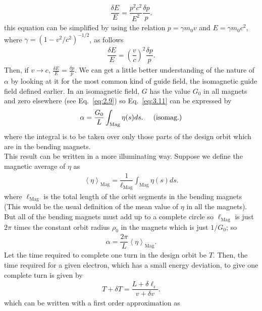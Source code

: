 \documentclass[../sands-adaptation.tex]{subfiles}
\begin{document}
\begin{align}
	\dfrac{\delta E}{E} = \dfrac{p^2 c^2}{E^2} \dfrac{\delta p}{p}.
\end{align}
this equation can be simplified by using the relation $p = \gamma m_0 v$ and $E = \gamma m_0 c^2$, where $\gamma = (1 - v^2/c^2)^{-1/2}$, as follows
\begin{align}\label{eq:E=P}
	\dfrac{\delta E}{E} = \left( \dfrac{v}{c} \right)^2 \dfrac{\delta p}{p}.
\end{align}
Then, if $v \to c$, $\frac{\delta E}{E} = \frac{\delta p}{p}$.
We can get a little better understanding of the nature of $\alpha$ by looking at it for the most common kind of guide field, the isomagnetic guide field defined earlier. In an isomagnetic field, $G$ has the value $G_0$ in all magnets and zero elsewhere (see Eq.~\eqref{eq:2.9}) so Eq.~\eqref{eq:3.11} can be expressed by
\begin{align} \label{eq:3.12}
	\alpha = \dfrac{G_0}{L} \int_{\text{Mag}} \eta(s) ds. \hspace{5mm} \text{(isomag.)}
\end{align}
where the integral is to be taken over only those parts of the design orbit which
are in the bending magnets.\\
This result can be written in a more illuminating way. Suppose we define the magnetic average of $\eta$ as
\begin{align} \label{eq:3.13}
	\left\langle \eta \right\rangle_{\text{Mag}} = \dfrac{1}{\ell_{\text{Mag}}} \int_{\text{Mag}} \eta(s) ds.
\end{align}
where $\ell_{\text{Mag}}$ is the total length of the orbit segments in the bending magnets (This would be the usual definition of the mean value of $\eta$ in all the magnets).
But all of the bending magnets must add up to a complete circle so $\ell_{\text{Mag}}$ is just $2\pi$ times the constant orbit radius $\rho_0$ in the magnets which is just $1/G_0$; so
\begin{align} \label{eq:3.14}
	\alpha = \dfrac{2\pi}{L} \left\langle \eta \right\rangle_{\text{Mag}}.
\end{align}
Let the time required to complete one turn in the design orbit be $T$. Then, the time required for a given electron, which has a small energy deviation, to give one complete turn is given by
\begin{align}
	T + \delta T = \dfrac{L + \delta \ell_\epsilon}{v + \delta v}.
\end{align}
which can be written with a first order approximation as
\end{document}
